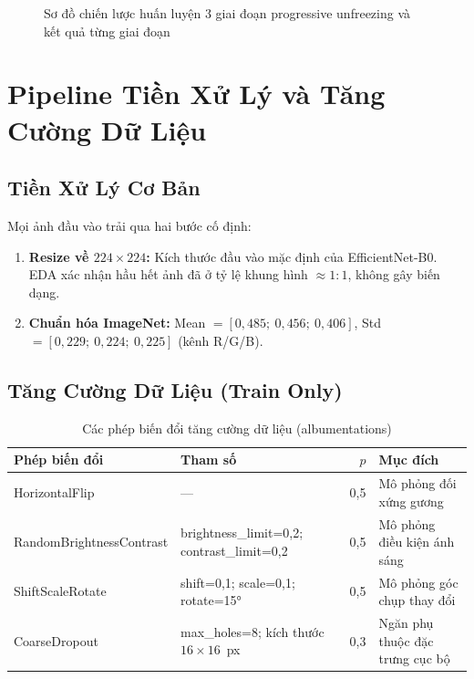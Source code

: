 \begin{figure}[H]
  \caption{Sơ đồ chiến lược huấn luyện 3 giai đoạn progressive unfreezing và kết quả từng giai đoạn}
  \label{fig:training_stages}
\end{figure}

\section{Pipeline Tiền Xử Lý và Tăng Cường Dữ Liệu}

\subsection{Tiền Xử Lý Cơ Bản}

Mọi ảnh đầu vào trải qua hai bước cố định:
\begin{enumerate}
  \item \textbf{Resize về $224 \times 224$:} Kích thước đầu vào mặc định của EfficientNet-B0. EDA xác nhận hầu hết ảnh đã ở tỷ lệ khung hình $\approx 1{:}1$, không gây biến dạng.
  \item \textbf{Chuẩn hóa ImageNet:} Mean $= [0{,}485;\ 0{,}456;\ 0{,}406]$, Std $= [0{,}229;\ 0{,}224;\ 0{,}225]$ (kênh R/G/B).
\end{enumerate}

\subsection{Tăng Cường Dữ Liệu (Train Only)}

\begin{table}[H]
  \centering
  \caption{Các phép biến đổi tăng cường dữ liệu (albumentations)}
  \label{tab:augmentation}
  \begin{tabularx}{\linewidth}{lXrl}
    \toprule
    \textbf{Phép biến đổi} & \textbf{Tham số} & \textbf{$p$} & \textbf{Mục đích} \\
    \midrule
    HorizontalFlip & --- & 0,5 & Mô phỏng đối xứng gương \\
    RandomBrightnessContrast & brightness\_limit=0,2; contrast\_limit=0,2 & 0,5 & Mô phỏng điều kiện ánh sáng \\
    ShiftScaleRotate & shift=0,1; scale=0,1; rotate=15° & 0,5 & Mô phỏng góc chụp thay đổi \\
    CoarseDropout & max\_holes=8; kích thước $16{\times}16$~px & 0,3 & Ngăn phụ thuộc đặc trưng cục bộ \\
    \bottomrule
  \end{tabularx}
\end{table}

